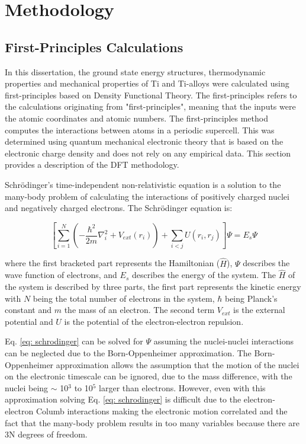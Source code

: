 \chapter{Methodology}

\section{First-Principles Calculations}

In this dissertation, the ground state energy structures, thermodynamic properties and mechanical properties of Ti and Ti-alloys were calculated using first-principles based on Density Functional Theory. The first-principles refers to the calculations originating from "first-principles", meaning that the inputs were the atomic coordinates and atomic numbers. The first-principles method computes the interactions between atoms in a periodic supercell. This was determined using quantum mechanical electronic theory that is based on the electronic charge density and does not rely on any empirical data. This section provides a description of the DFT methodology.

Schr\"odinger's time-independent non-relativistic equation is a solution to the many-body problem of calculating the interactions of positively charged nuclei and negatively charged electrons. The Schr\"odinger equation is:

\begin{equation}
\label{eq: schrodinger}
\left[ \sum_{i=1}^{N} \left( - \frac{\hbar^2}{2m} \nabla_{i}^2 + V_{ext} (r_{i}) \right) + \sum_{i<j} U (r_{i}, r_{j}) \right] \Psi = E_{s} \Psi
\end{equation}

\noindent where the first bracketed part represents the Hamiltonian ($\hat{H}$), $\Psi$ describes the wave function of electrons, and $E_{s}$ describes the energy of the system. The $\hat{H}$ of the system is described by three parts, the first part represents the kinetic energy with $N$ being the total number of electrons in the system, $\hbar$ being Planck's constant and $m$ the mass of an electron. The second term $V_{ext}$ is the external potential and $U$ is the potential of the electron-electron repulsion.

Eq. \ref{eq: schrodinger} can be solved for $\Psi$ assuming the nuclei-nuclei interactions can be neglected due to the Born-Oppenheimer approximation. The Born-Oppenheimer approximation allows the assumption that the motion of the nuclei on the electronic timescale can be ignored, due to the mass difference, with the nuclei being $\sim$ 10$^3$ to 10$^5$ larger than electrons. However, even with this approximation solving Eq. \ref{eq: schrodinger} is difficult due to the electron-electron Columb interactions making the electronic motion correlated and the fact that the many-body problem results in too many variables because there are 3N degrees of freedom. 

